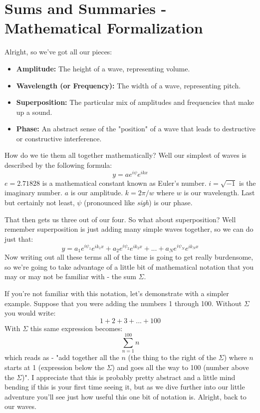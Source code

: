 \documentclass[10pt,a5paper]{book}
\begin{document}
\section{Sums and Summaries - Mathematical Formalization}
Alright, so we've got all our pieces:
\begin{itemize}
\item \textbf{Amplitude:} The height of a wave, representing volume.
\item \textbf{Wavelength (or Frequency):} The width of a wave, representing pitch.
\item \textbf{Superposition:} The particular mix of amplitudes and frequencies that make up a sound.
\item \textbf{Phase:} An abstract sense of the "position" of a wave that leads to destructive or constructive interference.
\end{itemize}

How do we tie them all together mathematically? Well our simplest of waves is described by the following formula:
\begin{equation}
y=a e^{i\psi}e^{ikx}
\end{equation}
$e=2.71828$ is a mathematical constant known as Euler's number. $i=\sqrt{-1}$ is the imaginary number. $a$ is our amplitude. $k=2\pi/w$ where $w$ is our wavelength. Last but certainly not least, $\psi$ (pronounced like \textit{sigh}) is our phase. 

That then gets us three out of our four. So what about superposition? Well remember superposition is just adding many simple waves together, so we can do just that: 
\begin{equation}
y = a_1 e^{i\psi_1}e^{ik_1x} + a_2 e^{i\psi_2}e^{ik_2x} + ... + a_N e^{i\psi_N}e^{ik_Nx}
\end{equation}
Now writing out all these terms all of the time is going to get really burdensome, so we're going to take advantage of a little bit of mathematical notation that you may or may not be familiar with - the sum $\Sigma$. 

If you're not familiar with this notation, let's demonstrate with a simpler example. Suppose that you were adding the numbers 1 through 100. Without $\Sigma$ you would write:
\begin{equation}
1 + 2 + 3 + ... + 100
\end{equation}
With $\Sigma$ this same expression becomes:
\begin{equation}
\sum_{n=1}^{100}n
\end{equation}
which reads as - "add together all the $n$ (the thing to the right of the $\Sigma$) where $n$ starts at 1 (expression below the $\Sigma$) and goes all the way to 100 (number above the $\Sigma$)". I appreciate that this is probably pretty abstract and a little mind bending if this is your first time seeing it, but as we dive further into our little adventure you'll see just how useful this one bit of notation is. Alright, back to our waves.
\end{document}
